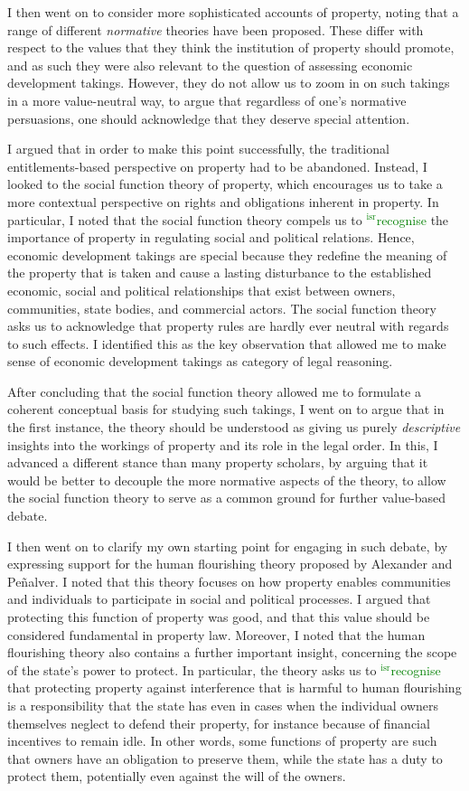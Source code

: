 \documentclass[12pt,a4paper]{book} %
\newcommand{\isr}[1]{\textcolor{green}{$^{\textrm{isr}}${#1}}}
\begin{document}
I then went on to consider more sophisticated accounts of property, noting that a range of different {\it normative} theories have been proposed. These differ with respect to the values that they think the institution of property should promote, and as such they were also relevant to the question of assessing economic development takings. However, they do not allow us to zoom in on such takings in a more value-neutral way, to argue that regardless of one's normative persuasions, one should acknowledge that they deserve special attention.

I argued that in order to make this point successfully, the traditional entitlements-based perspective on property had to be abandoned. Instead, I looked to the social function theory of property, which encourages us to take a more contextual perspective on rights and obligations inherent in property. In particular, I noted that the social function theory compels us to \isr{recognise} the importance of property in regulating social and political relations. Hence, economic development takings are special because they redefine the meaning of the property that is taken and cause a lasting disturbance to the established economic, social and political relationships that exist between owners, communities, state bodies, and commercial actors. The social function theory asks us to acknowledge that property rules are hardly ever neutral with regards to such effects. I identified this as the key observation that allowed me to make sense of economic development takings as category of legal reasoning.

After concluding that the social function theory allowed me to formulate a coherent conceptual basis for studying such takings, I went on to argue that in the first instance, the theory should be understood as giving us purely {\it descriptive} insights into the workings of property and its role in the legal order. In this, I advanced a different stance than many property scholars, by arguing that it would be better to decouple the more normative aspects of the theory, to allow the social function theory to serve as a common ground for further value-based debate.

I then went on to clarify my own starting point for engaging in such debate, by expressing support for the human flourishing theory proposed by Alexander and Pe\~{n}alver. I noted that this theory focuses on how property enables communities and individuals to  participate in social and political processes. I argued that protecting this function of property was good, and that this value should be considered fundamental in property law. Moreover, I noted that the human flourishing theory also contains a further important insight, concerning the scope of the state's power to protect. In particular, the theory asks us to \isr{recognise} that protecting property against interference that is harmful to human flourishing is a responsibility that the state has even in cases when the individual owners themselves neglect to defend their property, for instance because of financial incentives to remain idle. In other words, some functions of property are such that owners have an obligation to preserve them, while the state has a duty to protect them, potentially even against the will of the owners.
\end{document}
